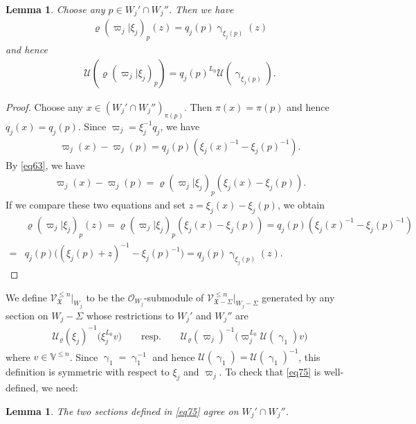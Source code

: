 \documentclass[12pt,b5paper,notitlepage]{report}
\theoremstyle{definition}
\theoremstyle{plain}
\newtheorem{lm}[df]{Lemma}
\newcommand{\fk}{\mathfrak}
\newcommand{\mc}{\mathcal}
\newcommand{\scr}{\mathscr}
\newcommand{\Vbb}{\mathbb V}
\numberwithin{equation}{section}
\begin{document}
\begin{lm}\label{lb123}
Choose any $p\in W_j'\cap W_j''$. Then we have
\begin{gather*}
\varrho(\varpi_j|\xi_j)_p(z)=q_j(p)\upgamma_{\xi_j(p)}(z)
\end{gather*}
and hence
\begin{align*}
\mc U(\varrho(\varpi_j|\xi_j)_p)=q_j(p)^{L_0}\mc U(\upgamma_{\xi_j(p)}).
\end{align*}
\end{lm}
\begin{proof}
Choose any $x\in (W_j'\cap W_j'')_{\pi(p)}$. Then $\pi(x)=\pi(p)$ and hence $q_j(x)=q_j(p)$.  Since $\varpi_j=\xi_j^{-1}q_j$, we have
\begin{align*}
\varpi_j(x)-\varpi_j(p)=q_j(p)(\xi_j(x)^{-1}-\xi_j(p)^{-1}).
\end{align*}
By \eqref{eq63}, we have
\begin{align*}
\varpi_j(x)-\varpi_j(p)=\varrho(\varpi_j|\xi_j)_p(\xi_j(x)-\xi_j(p)).
\end{align*}
If we compare these two equations and set $z=\xi_j(x)-\xi_j(p)$, we obtain
\begin{align*}
&\varrho(\varpi_j|\xi_j)_p(z)=\varrho(\varpi_j|\xi_j)_p(\xi_j(x)-\xi_j(p))=q_j(p)(\xi_j(x)^{-1}-\xi_j(p)^{-1})\\
=&q_j(p)\big((\xi_j(p)+z)^{-1}-\xi_j(p)^{-1} \big)=q_j(p)\upgamma_{\xi_j(p)}(z).
\end{align*}
\end{proof}



We   define $\scr V_{\fk X}^{\leq n}|_{W_j}$ to be the  $\scr O_{W_j}$-submodule of $\scr V_{\fk X-\Sigma}^{\leq n}|_{W_j-\Sigma}$ generated by any section on $W_j-\Sigma$ whose restrictions to $W_j'$ and $W_j''$ are
\begin{align}
\boxed{~~\mc U_\varrho(\xi_j)^{-1}\big(\xi_j^{L_0}v\big)\qquad\text{resp.}\qquad \mc U_\varrho(\varpi_j)^{-1}\big(\varpi_j^{L_0}\mc U(\upgamma_1)v\big)  ~~}\label{eq75}
\end{align}
where $v\in\Vbb^{\leq n}$. Since $\upgamma_1=\upgamma_1^{-1}$ and hence $\mc U(\upgamma_1)=\mc U(\upgamma_1)^{-1}$, this definition is symmetric with respect to $\xi_j$ and $\varpi_j$. To check that \eqref{eq75} is well-defined, we need:

\begin{lm}
The two sections defined in \eqref{eq75} agree on $W_j'\cap W_j''$.
\end{lm}
\end{document}
